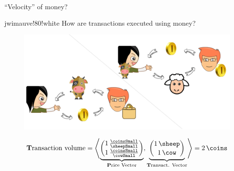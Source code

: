\begin{frame}{``Velocity'' of money?}	
	\vspace{1ex}
	\begin{alertblockc}[N]{}{jwimauve!80!white}%
		How are transactions executed using money?
	\end{alertblockc}
	\vspace{0.5ex}
  \begin{figure}
    \centerline{\includegraphics[scale=0.105]{./pics/used/sheep_example_intro_HR(3)}}
  \end{figure}
  \centering
  \vspace{-2em}
  \begin{align*}%
    \text{\textbf{T}ransaction volume} = %
    \Biggl\langle
    \underbrace{ 
      \renewcommand*{\arraystretch}{1.035}
      \begin{pmatrix}%
      1\,\frac{\coinsSmall}{\sheepSmall} \\%
      1\,\frac{\coinsSmall}{\cowSmall}%
    \end{pmatrix}
  }_{\text{\textbf{P}rice Vector}}
    , %
    \underbrace{
      \renewcommand*{\arraystretch}{1.1}
      \begin{pmatrix}%
      1\,\sheep \\%
      1\,\cow%
    \end{pmatrix}
  }_{\text{\textbf{T}ransact. Vector}}
    \Biggr\rangle %
    = 2\,\coins
  \end{align*} %
  \\%
\end{frame}

